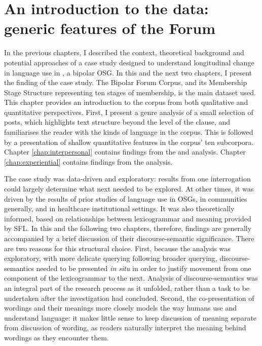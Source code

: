 
\chapter{An introduction to the data: generic features of the Forum} \label{chap:introdata}

In the previous chapters, I described the context, theoretical background and potential approaches of a case study designed to understand longitudinal change in language use in \emph{}, a \gls{bipolar} \gls{OSG}. In this and the next two chapters, I present the finding of the case study. The Bipolar Forum Corpus, and its Membership Stage Structure representing ten stages of membership, is the main dataset used. This chapter provides an introduction to the \gls{corpus} from both qualitative and quantitative perspectives. First, I present a genre analysis of a small selection of \glspl{post}, which highlights text structure beyond the level of the clause, and familiarises the reader with the kinds of language in the \gls{corpus}. This is followed by a presentation of shallow quantitative features in the \gls{corpus}' ten subcorpora. Chapter \ref{chap:interpersonal} contains findings from the  and  analysis. Chapter \ref{chap:experiential} contains findings from the  analysis.

The case study was data\hyp{}driven and exploratory: results from one interrogation could largely determine what next needed to be explored. At other times, it was driven by the results of prior studies of language use in \glspl{OSG}, in communities generally, and in healthcare institutional settings. It was also theoretically informed, based on relationships between \gls{lexicogrammar} and meaning provided by \gls{SFL}. In this and the following two chapters, therefore, findings are generally accompanied by a brief discussion of their \gls{discourse-semantic} significance. There are two reasons for this structural choice. First, because the analysis was exploratory, with more delicate querying following broader querying, \glspl{discourse-semantic} needed to be presented \emph{in situ} in order to justify movement from one component of the \gls{lexicogrammar} to the next. Analysis of \glspl{discourse-semantic} was an integral part of the research process as it unfolded, rather than a task to be undertaken after the investigation had concluded. Second, the co\hyp{}presentation of wordings and their meanings more closely models the way humans use and understand language: it makes little sense to keep discussion of meaning separate from discussion of wording, as readers naturally interpret the meaning behind wordings as they encounter them.

